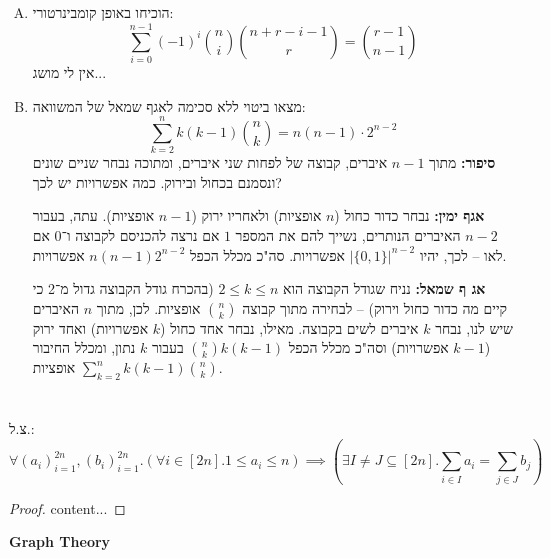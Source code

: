 \documentclass[]{article}
\newcommand\sen   {\begin{otherlanguage}{english}}
\newcommand\she   {\end{otherlanguage}}
\newcommand\bink      {\binom{n}{k}}
\begin{document}
	\section{}
	\begin{enumerate}[(A)]
		\item הוכיחו באופן קומבינרטורי: 
		\[ \sum_{i = 0}^{n - 1}(-1)^{i} \binom{n}{i} \binom{n + r - i - 1}{r} = \binom{r - 1}{n - 1} \]
		אין לי מושג... 
		\item מצאו ביטוי ללא סכימה לאגף שמאל של המשוואה: 
		\[ \sum_{k = 2}^{n} k(k - 1)\bink = n(n - 1) \cdot 2^{n - 2} \]
		\textbf{סיפור: }מתוך $n - 1$ איברים, קבוצה של לפחות שני איברים, ומתוכה נבחר שניים שונים ונסמנם בכחול ובירוק. כמה אפשרויות יש לכך? 
		
		\textbf{אגף ימין: }נבחר כדור כחול ($n$ אופציות) ולאחריו ירוק ($n - 1$ אופציות). עתה, בעבור $n - 2$ האיברים הנותרים, נשייך להם את המספר $1$ אם נרצה להכניסם לקבוצה ו־$0$ אם לאו – לכך, יהיו $|\{0, 1\}|^{n - 2}$ אפשרויות. סה"כ מכלל הכפל $n(n - 1)2^{n - 2}$ אפשרויות. 
		
		\textbf{אג ף שמאל: }נניח שגודל הקבוצה הוא $2 \le k \le n$ (בהכרח גודל הקבוצה גדול מ־2 כי קיים מה כדור כחול וירוק) – לבחירה מתוך קבוצה $\bink$ אופציות. לכן, מתוך $n$ האיברים שיש לנו, נבחר $k$ איברים לשים בקבוצה. מאילו, נבחר אחד כחול ($k$ אפשרויות) ואחד ירוק ($k - 1$ אפשרויות) וסה"כ מכלל הכפל $\binom{n}{k}k(k - 1)$ בעבור $k$ נתון, ומכלל החיבור $\sum_{k = 2}^{n}k(k - 1)\bink$ אופציות. 
		
	\end{enumerate}
	\section{}
	צ.ל.: 
	\[ \textstyle \forall (a_i)_{i = 1}^{2n}, (b_i)_{i = 1}^{2n}. (\forall i \in [2n]. 1 \le a_i \le n) \implies (\exists I \neq J \subseteq [2n]. \sum_{i \in I} a_i = \sum_{j \in J}b_j) \]
	\begin{proof}
		content...
	\end{proof}
	
	\setcounter{section}{0}
	{\Large \sen\hfill \textbf{Graph Theory} \hfill\she}
	
\end{document}
